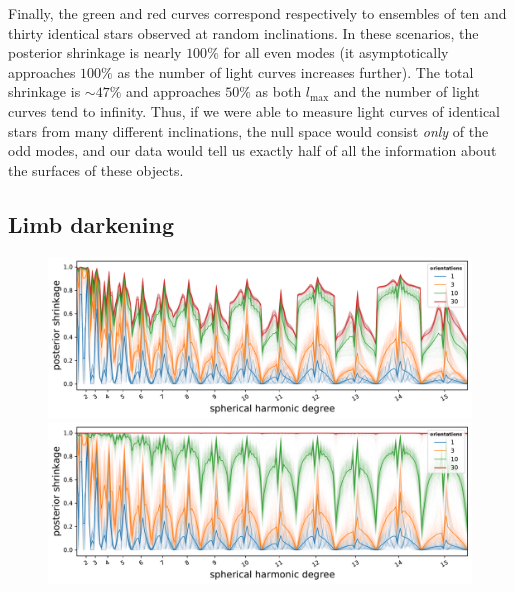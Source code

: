 \documentclass[modern]{aastex62}
\begin{document}
Finally, the green and red curves correspond respectively to ensembles of ten and thirty
identical stars observed at random inclinations.
In these scenarios, the posterior shrinkage
is nearly $100\%$
for all even modes (it asymptotically approaches $100\%$ as the number
of light curves increases further). The total shrinkage is $\sim 47\%$
and approaches $50\%$ as both $l_\mathrm{max}$  and the number of light curves
tend to infinity. Thus, if we were able to measure light curves of identical stars
from many different inclinations, the null space would consist \emph{only}
of the odd modes, and our data would tell us exactly half of all the
information about the surfaces of these objects.

\subsection{Limb darkening}
\label{sec:limbdark}


\begin{figure}[t!]
    \begin{centering}
        \includegraphics[width=\linewidth]{figures/nullspace_ensemble_ld.pdf}
        \\
        \includegraphics[width=\linewidth]{figures/nullspace_ensemble_ld_var.pdf}
    \end{centering}
\end{figure}
\end{document}
